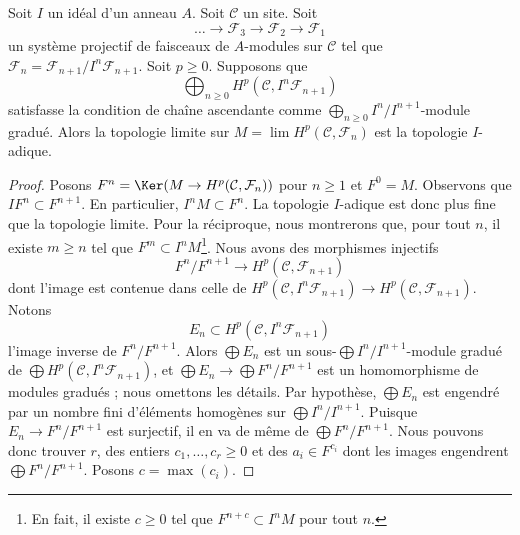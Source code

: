 \begin{lemma}
\label{lemma-topology-I-adic-general}
Soit $I$ un idéal d'un anneau $A$. Soit $\mathcal{C}$ un site. Soit
$$
\ldots \to \mathcal{F}_3 \to \mathcal{F}_2 \to \mathcal{F}_1
$$
un système projectif de faisceaux de $A$-modules sur $\mathcal{C}$ tel que
$\mathcal{F}_n = \mathcal{F}_{n + 1}/I^n\mathcal{F}_{n + 1}$. Soit
$p \geq 0$. Supposons que
$$
\bigoplus\nolimits_{n \geq 0} H^p(\mathcal{C}, I^n\mathcal{F}_{n + 1})
$$
satisfasse la condition de chaîne ascendante comme
$\bigoplus_{n \geq 0} I^n/I^{n + 1}$-module gradué. Alors la topologie
limite sur $M = \lim H^p(\mathcal{C}, \mathcal{F}_n)$ est la topologie
$I$-adique.
\end{lemma}

\begin{proof}
Posons $F^n = \Ker(M \to H^p(\mathcal{C}, \mathcal{F}_n))$ pour
$n \geq 1$ et $F^0 = M$. Observons que
$I F^n \subset F^{n + 1}$. En particulier, $I^n M \subset F^n$. La
topologie $I$-adique est donc plus fine que la topologie limite. Pour la
réciproque, nous montrerons que, pour tout $n$, il existe $m \geq n$ tel
que $F^m \subset I^nM$\footnote{En fait, il existe $c \geq 0$ tel que
$F^{n + c} \subset I^nM$ pour tout $n$.}. Nous avons des morphismes
injectifs
$$
F^n/F^{n + 1} \longrightarrow H^p(\mathcal{C}, \mathcal{F}_{n + 1})
$$
dont l'image est contenue dans celle de
$H^p(\mathcal{C}, I^n\mathcal{F}_{n + 1}) \to
H^p(\mathcal{C}, \mathcal{F}_{n + 1})$.
Notons
$$
E_n \subset H^p(\mathcal{C}, I^n\mathcal{F}_{n + 1})
$$
l'image inverse de $F^n/F^{n + 1}$. Alors $\bigoplus E_n$ est un
sous-$\bigoplus I^n/I^{n + 1}$-module gradué de
$\bigoplus H^p(\mathcal{C}, I^n\mathcal{F}_{n + 1})$, et
$\bigoplus E_n \to \bigoplus F^n/F^{n + 1}$ est un homomorphisme de
modules gradués ; nous omettons les détails. Par hypothèse,
$\bigoplus E_n$ est engendré par un nombre fini d'éléments homogènes sur
$\bigoplus I^n/I^{n + 1}$. Puisque $E_n \to F^n/F^{n + 1}$ est surjectif,
il en va de même de $\bigoplus F^n/F^{n + 1}$. Nous pouvons donc trouver
$r$, des entiers $c_1, \ldots, c_r \geq 0$ et des $a_i \in F^{c_i}$ dont
les images engendrent $\bigoplus F^n/F^{n + 1}$. Posons
$c = \max(c_i)$.


\end{proof}
